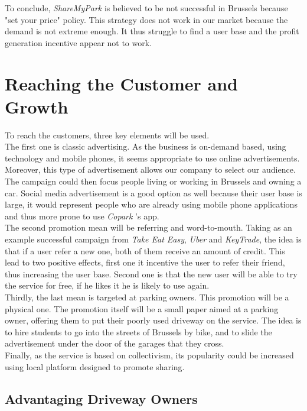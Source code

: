 \documentclass[12pt,a4paper,oneside]{book}
\newcommand{\bp}{\textit{Copark }}
\begin{document}
To conclude, \textit{ShareMyPark} is believed to be not successful in Brussels because "set your price" policy. This strategy does not work in our market because the demand is not extreme enough. It thus struggle to find a user base and the profit generation incentive appear not to work.

\section{Reaching the Customer and Growth}
To reach the customers, three key elements will be used.\\

The first one is classic advertising. As the business is on-demand based, using technology and mobile phones, it seems appropriate to use online advertisements. Moreover, this type of advertisement allows our company to select our audience. The campaign could then focus people living or working in Brussels and owning a car. Social media advertisement is a good option as well because their user base is large, it would represent people who are already using mobile phone applications and thus more prone to use \bp's app.\\

The second promotion mean will be referring and word-to-mouth. Taking as an example successful campaign from \textit{Take Eat Easy}, \textit{Uber} and \textit{KeyTrade}, the idea is that if a user refer a new one, both of them receive an amount of credit. This lead to two positive effects, first one it incentive the user to refer their friend, thus increasing the user base. Second one is that the new user will be able to try the service for free, if he likes it he is likely to use again.\\

Thirdly, the last mean is targeted at parking owners. This promotion will be a physical one. The promotion itself will be a small paper aimed at a parking owner, offering them to put their poorly used driveway on the service. The idea is to hire students to go into the streets of Brussels by bike, and to slide the advertisement under the door of the garages that they cross.\\

Finally, as the service is based on collectivism, its popularity could be increased using local platform designed to promote sharing.

\subsection{Advantaging Driveway Owners}
\end{document}
